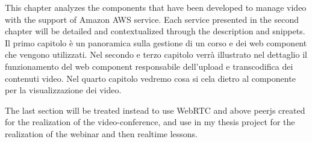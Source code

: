 This chapter analyzes the components that have been developed to manage video with the support of Amazon AWS service.
Each service presented in the second chapter will be detailed and contextualized through the description and snippets. 
Il primo capitolo è un panoramica sulla gestione di un corso e dei web component che vengono utilizzati.
Nel secondo e terzo capitolo verrà illustrato nel dettaglio il funzionamento del web component responsabile dell'upload e transcodifica dei contenuti video.
Nel quarto capitolo vedremo cosa si cela dietro al componente per la visualizzazione dei video.


The last section will be treated instead to use WebRTC and above peerjs created for the realization of the video-conference, and use in my thesis project for the realization of the webinar and then realtime lessons.